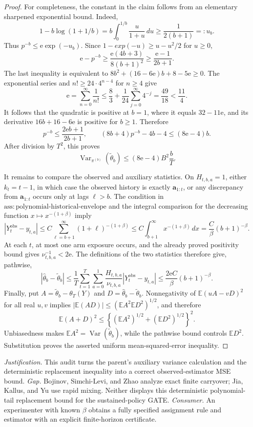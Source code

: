 \documentclass{article}
\begin{document}
\begin{proof}
For completeness, the constant in the claim follows from an elementary sharpened exponential bound.  Indeed,
\[
 1-b\log(1+1/b)
 =b\int_0^{1/b}\frac{u}{1+u}\,du
 \ge\frac1{2(b+1)}=:u_b.
\]
Thus \(p^{-b}\le \mathrm e\exp(-u_b)\).  Since \(1-exp(-u)\ge u-u^2/2\) for \(u\ge0\),
\[
 \mathrm e-p^{-b}\ge
 \frac{\mathrm e(4b+3)}{8(b+1)^2}
 \ge\frac{\mathrm e-1}{2b+1}.
\]
The last inequality is equivalent to
\(8b^2+(16-6\mathrm e)b+8-5\mathrm e\ge0\).  The exponential series and \(n!\ge24\cdot4^{n-4}\) for \(n\ge4\) give
\[
 \mathrm e=\sum_{n=0}^{\infty}\frac1{n!}
 \le\frac83+\frac1{24}\sum_{j=0}^{\infty}4^{-j}
 =\frac{49}{18}<\frac{11}{4}.
\]
It follows that the quadratic is positive at \(b=1\), where it equals \(32-11\mathrm e\), and its derivative \(16b+16-6\mathrm e\) is positive for \(b\ge1\).  Therefore
\[
 p^{-b}\le\frac{2\mathrm e b+1}{2b+1},
 \qquad
 (8b+4)p^{-b}-4b-4\le(8\mathrm e-4)b.
\]
After division by \(T^2\), this proves
\[
 \operatorname{Var}_{\pi^{(b)}}(\widetilde\theta_b)
 \le(8\mathrm e-4)B^2\frac bT.
\]

It remains to compare the observed and auxiliary statistics.  On \(H_{t,b,a}=1\), either \(k_t=t-1\), in which case the observed history is exactly \(\mathbf a_{1:t}\), or any discrepancy from \(\mathbf a_{1:t}\) occurs only at lags \(\ell>b\).  The condition in \(\mathrm{ass{:}polynomial\mbox{-}historical\mbox{-}envelope}\) and the integral comparison for the decreasing function \(x\mapsto x^{-(1+\beta)}\) imply
\[
 \left|Y_t^{\mathrm{obs}}-y_{t,a}\right|
 \le C\sum_{\ell=b+1}^{\infty}(1+\ell)^{-(1+\beta)}
 \le C\int_{b+1}^{\infty}x^{-(1+\beta)}\,dx
 =\frac C\beta(b+1)^{-\beta}.
\]
At each \(t\), at most one arm exposure occurs, and the already proved positivity bound gives \(\nu_{t,b,a}^{-1}<2\mathrm e\).  The definitions of the two statistics therefore give, pathwise,
\[
 \left|\widehat\theta_b-\widetilde\theta_b\right|
 \le\frac1T\sum_{t=1}^T\sum_{a=0}^1
 \frac{H_{t,b,a}}{\nu_{t,b,a}}
 \left|Y_t^{\mathrm{obs}}-y_{t,a}\right|
 \le\frac{2\mathrm e C}{\beta}(b+1)^{-\beta}.
\]
Finally, put \(A=\widetilde\theta_b-\theta_T(Y)\) and \(D=\widehat\theta_b-\widetilde\theta_b\).  Nonnegativity of \(\mathbb E(uA-vD)^2\) for all real \(u,v\) implies \(|\mathbb E(AD)|\le(\mathbb EA^2\mathbb ED^2)^{1/2}\), and therefore
\[
 \mathbb E(A+D)^2
 \le\left\{(\mathbb EA^2)^{1/2}+(\mathbb ED^2)^{1/2}\right\}^2.
\]
Unbiasedness makes \(\mathbb EA^2=\operatorname{Var}(\widetilde\theta_b)\), while the pathwise bound controls \(\mathbb ED^2\).  Substitution proves the asserted uniform mean-squared-error inequality.
\end{proof}
\par\smallskip\noindent \textit{Justification.} This audit turns the parent's auxiliary variance calculation and the deterministic replacement inequality into a correct observed-estimator MSE bound. \textit{Gap.} Bojinov, Simchi-Levi, and Zhao analyze exact finite carryover; Jia, Kallus, and Yu use rapid mixing. Neither displays this deterministic polynomial-tail replacement bound for the sustained-policy GATE. \textit{Consumer.} An experimenter with known \(\beta\) obtains a fully specified assignment rule and estimator with an explicit finite-horizon certificate.
\end{document}
